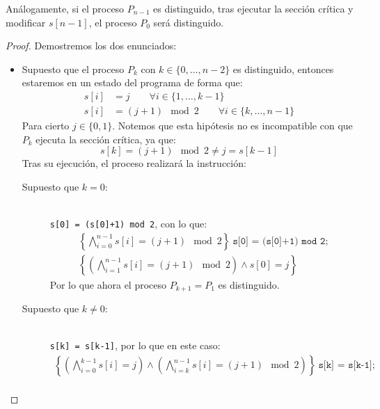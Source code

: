 \begin{ejercicio}
\begin{prop}
        \noindent
        Análogamente, si el proceso $P_{n-1}$ es distinguido, tras ejecutar la sección crítica y modificar $s[n-1]$, el proceso $P_0$ será distinguido.
        \begin{proof} Demostremos los dos enunciados:
            \begin{itemize}
                \item Supuesto que el proceso $P_k$ con $k \in \{0,\ldots,n-2\}$ es distinguido, entonces estaremos en un estado del programa de forma que:
                    \begin{align*}
                        s[i] &= j \qquad \forall i \in \{1,\ldots,k-1\} \\
                        s[i] &= (j+1)\mod 2 \qquad \forall i \in \{k,\ldots,n-1\} 
                    \end{align*}
                    Para cierto $j\in \{0,1\}$. Notemos que esta hipótesis no es incompatible con que $P_k$ ejecuta la sección crítica, ya que:
                    \begin{equation*}
                        s[k] = (j+1)\mod 2 \neq j = s[k-1]
                    \end{equation*}
                    Tras su ejecución, el proceso realizará la instrucción:
                    \begin{description}
                        \item [Supuesto que $k=0$:]~\\
                            \verb|s[0] = (s[0]+1) mod 2|, con lo que:
                            \begin{multline*}
                                \left\{\bigwedge_{i=0}^{n-1}s[i] = (j+1)\mod 2\right\}\ \texttt{s[0] = (s[0]+1) mod 2;}\\ \left\{\left(\bigwedge_{i=1}^{n-1}s[i] = (j+1)\mod 2\right)\land s[0] = j\right\}
                            \end{multline*}
                            Por lo que ahora el proceso $P_{k+1} = P_1$ es distinguido.
                        \item [Supuesto que $k\neq 0$:]~\\
                            \verb|s[k] = s[k-1]|, por lo que en este caso:
                            \begin{multline*}
                                \left\{\left(\bigwedge_{i=0}^{k-1}s[i] = j\right)\land\left(\bigwedge_{i=k}^{n-1}s[i] = (j+1)\mod 2\right)\right\}\ \texttt{s[k] = s[k-1];}\\ 

\end{multline*}
\end{description}
\end{itemize}
\end{proof}
\end{prop}
\end{ejercicio}
